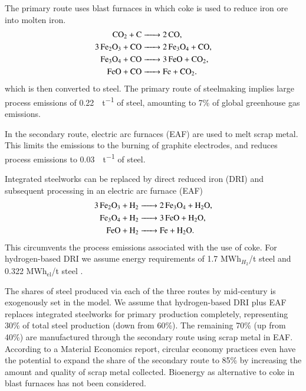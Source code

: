 The primary route uses blast furnaces in which coke is used to reduce iron ore
into molten iron.
\begin{align}
    \ce{CO2 + C &-> 2CO}, \\
    \ce{3Fe2O3 + CO &-> 2Fe3O4 + CO}, \\
    \ce{Fe3O4 + CO &-> 3FeO + CO2}, \\
    \ce{FeO + CO &-> Fe + CO2}.
\end{align}
which is then converted to steel. The primary route of steelmaking implies large
process emissions of \SI{0.22}{\tco\per\tonne} of steel, amounting to 7\% of
global greenhouse gas emissions.

In the secondary route, electric arc furnaces (EAF) are used to melt scrap
metal. This limits the \co emissions to the burning of graphite electrodes,
 and reduces process emissions to
\SI{0.03}{\tco\per\tonne} of steel.

Integrated steelworks can be replaced by direct reduced iron (DRI) and subsequent processing in an electric arc furnace (EAF)
\begin{align}
    \ce{3Fe2O3 + H2 &-> 2Fe3O4 + H2O}, \\
    \ce{Fe3O4 + H2 &-> 3FeO + H2O}, \\
    \ce{FeO + H2 &-> Fe + H2O}.
\end{align}
This circumvents the process emissions associated with the use of coke. For
hydrogen-based DRI we assume energy requirements of 1.7 MWh$_{H_2}$/t steel
 and 0.322 MWh$_{\text{el}}$/t steel
.

The shares of steel produced via each of the three routes by mid-century is exogenously
set in the model. We assume that hydrogen-based DRI plus EAF replaces integrated
steelworks for primary production completely, representing 30\% of total steel
production (down from 60\%). The remaining 70\% (up from 40\%) are manufactured
through the secondary route using scrap metal in EAF. According to
a Material Economics report, circular economy practices even have the potential to
expand the share of the secondary route to 85\% by increasing the amount and
quality of scrap metal collected. Bioenergy as alternative to coke in blast
furnaces has not been considered.

